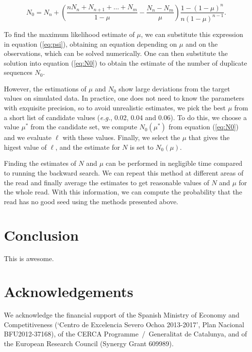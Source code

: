 \documentclass{article}
\begin{document}
\begin{equation*}
N_0 = N_n +
\left(\frac{nN_n+N_{n+1}+\ldots+N_m}{1-\mu}-
\frac{N_n-N_m}{\mu} \right)
\frac{1-(1-\mu)^n}{n(1-\mu)^{n-1}}.
\end{equation*}

To find the maximum likelihood estimate of $\mu$, we can substitute this
expression in equation (\ref{eq:psi}), obtaining an equation depending on
$\mu$ and on the observations, which can be solved numerically. One can
then substitute the solution into equation (\ref{eq:N0}) to obtain the
estimate of the number of duplicate sequences $N_0$.

However, the estimations of $\mu$ and $N_0$ show large deviations from the
target values on simulated data. In practice, one does not need to know
the parameters with exquisite precision, so to avoid unrealistic
estimates, we pick the best $\mu$ from a short list of candidate values
(\textit{e.g.}, 0.02, 0.04 and 0.06). To do this, we choose a value
$\mu^*$ from the candidate set, we compute $N_0(\mu^*)$ from equation
(\ref{eq:N0}) and we evaluate $\ell$ with these values. Finally, we select
the $\mu$ that gives the higest value of $\ell$, and the estimate for
$N$ is set to $N_0(\mu)$.

Finding the estimates of $N$ and $\mu$ can be performed in negligible time
compared to running the backward search. We can repeat this method at
different areas of the read and finally average the estimates to get
reasonable values of $N$ and $\mu$ for the whole read. With this
information, we can compute the probability that the read has no good seed
using the methods presented above.



\section{Conclusion}

This is awesome.

\section*{Acknowledgements}

We acknowledge the financial support of the Spanish Ministry of Economy
and Competitiveness (‘Centro de Excelencia Severo Ochoa 2013-2017’, Plan
Nacional BFU2012-37168), of the CERCA Programme~/~Generalitat de
Catalunya, and of the European Research Council (Synergy Grant 609989).






\end{document}
